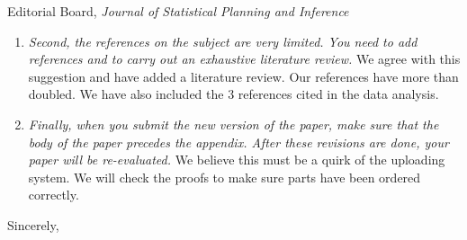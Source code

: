 \documentclass[10pt]{letter}
\begin{document}
\begin{letter}{Editorial Board, \emph{Journal of Statistical Planning and Inference} }
\begin{enumerate}
\item \emph{Second, the references on the subject are very
    limited. You need to add references and to carry out an exhaustive
    literature review.} We agree with this suggestion and have added a
  literature review. Our references have more than doubled. We have
  also included the 3 references cited in the data analysis.

\item \emph{Finally, when you submit the new version of the paper,
    make sure that the body of the paper precedes the appendix. After
    these revisions are done, your paper will be re-evaluated.}  We
  believe this must be a quirk of the uploading system. We will check
  the proofs to make sure parts have been ordered correctly.
\end{enumerate}
\vspace{2\parskip} %
\closing{Sincerely,}


\end{letter}
\end{document}
